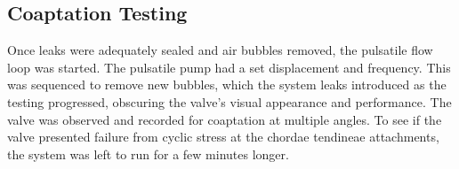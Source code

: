 \subsection{Coaptation Testing}
Once leaks were adequately sealed and air bubbles removed, the pulsatile flow loop was started. The pulsatile pump had a set displacement and frequency.
This was sequenced to remove new bubbles, which the system leaks introduced as the testing progressed, obscuring the valve's visual appearance and performance.
The valve was observed and recorded for coaptation at multiple angles.
To see if the valve presented failure from cyclic stress at the chordae tendineae attachments, the system was left to run for a few minutes longer.


